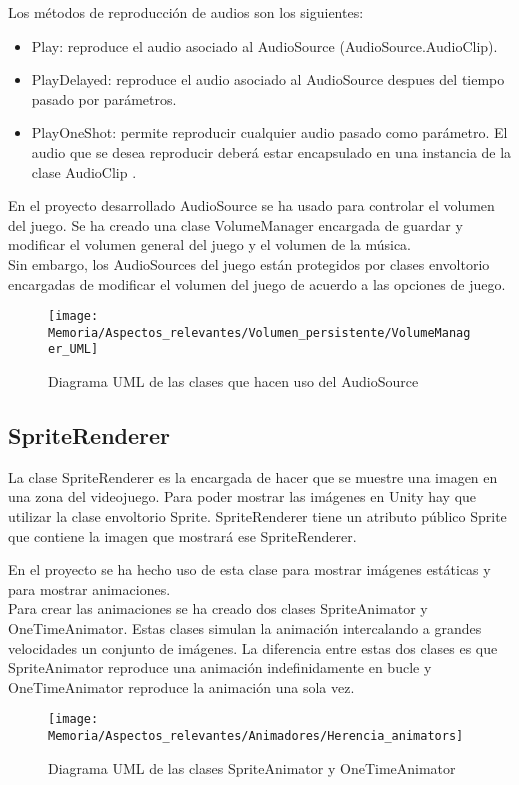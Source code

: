 Los métodos de reproducción de audios son los siguientes:
\begin{itemize}
\item
Play: reproduce el audio asociado al AudioSource (AudioSource.AudioClip).
\item
PlayDelayed: reproduce el audio asociado al AudioSource despues del tiempo pasado por parámetros.
\item
PlayOneShot: permite reproducir cualquier audio pasado como parámetro. El audio que se desea reproducir deberá estar encapsulado en una instancia de la clase AudioClip \cite{AudioClip} .
\end{itemize}

En el proyecto desarrollado AudioSource se ha usado para controlar el volumen del juego. Se ha creado una clase VolumeManager encargada de guardar y modificar el volumen general del juego y el volumen de la música.\\
Sin embargo, los AudioSources del juego están protegidos por clases envoltorio encargadas de modificar el volumen del juego de acuerdo a las opciones de juego.

\begin{figure}[h]
\texttt{[image: Memoria/Aspectos\_relevantes/Volumen\_persistente/VolumeManager\_UML]}
\caption{Diagrama UML de las clases que hacen uso del AudioSource}
\end{figure}

\subsection{SpriteRenderer}
La clase SpriteRenderer es la encargada de hacer que se muestre una imagen en una zona del videojuego. Para poder mostrar las imágenes en Unity hay que utilizar la clase envoltorio Sprite. SpriteRenderer tiene un atributo público Sprite que contiene la imagen que mostrará ese SpriteRenderer.

En el proyecto se ha hecho uso de esta clase para mostrar imágenes estáticas y para mostrar animaciones.\\
Para crear las animaciones se ha creado dos clases SpriteAnimator y OneTimeAnimator. Estas clases simulan la animación intercalando a grandes velocidades un conjunto de imágenes. La diferencia entre estas dos clases es que SpriteAnimator reproduce una animación indefinidamente en bucle y OneTimeAnimator reproduce la animación una sola vez.

\begin{figure}[h]
\centering
\texttt{[image: Memoria/Aspectos\_relevantes/Animadores/Herencia\_animators]}
\caption{Diagrama UML de las clases SpriteAnimator y OneTimeAnimator}
\end{figure}

